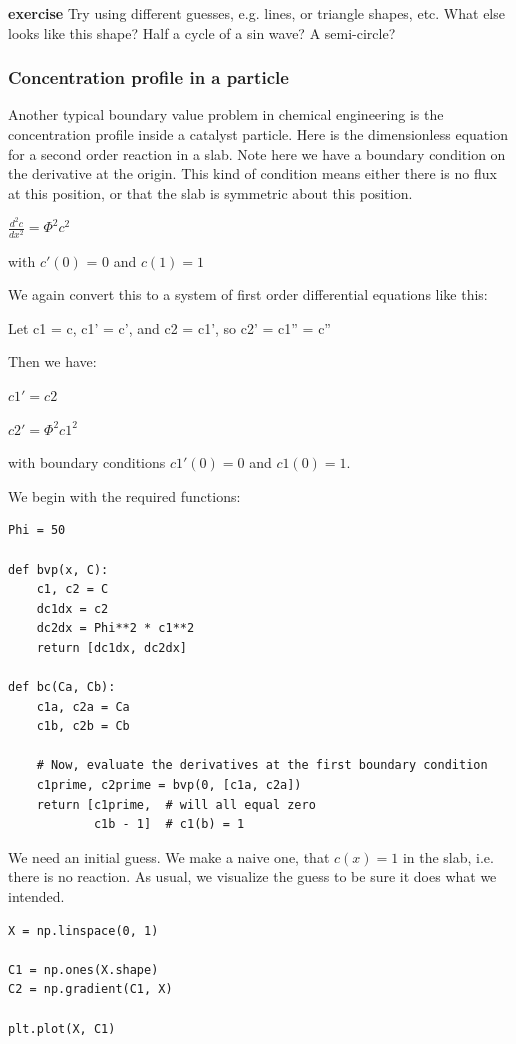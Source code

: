 \documentclass[11pt]{article}
\begin{document}
\textbf{exercise} Try using different guesses, e.g. lines, or triangle shapes, etc. What else looks like this shape? Half a cycle of a sin wave? A semi-circle?

\subsubsection{Concentration profile in a particle}
\label{sec:org2f36a69}

Another typical boundary value problem in chemical engineering is the concentration profile inside a catalyst particle. Here is the dimensionless equation for a second order reaction in a slab. Note here we have a boundary condition on the derivative at the origin. This kind of condition means either there is no flux at this position, or that the slab is symmetric about this position.

\(\frac{d^2c}{dx^2} = \Phi^2 c^2\)

with \(c'(0)\) = 0 and \(c(1) = 1\)

We again convert this to a system of first order differential equations like this:

Let c1 = c, c1' = c', and c2 = c1', so c2' = c1'' = c''

Then we have:

\(c1' = c2\)

\(c2' = \Phi^2 c1^2\)

with boundary conditions \(c1'(0) = 0\) and \(c1(0) = 1\).

We begin with the required functions:

\begin{verbatim}
Phi = 50

def bvp(x, C):
    c1, c2 = C
    dc1dx = c2
    dc2dx = Phi**2 * c1**2
    return [dc1dx, dc2dx]

def bc(Ca, Cb):
    c1a, c2a = Ca
    c1b, c2b = Cb

    # Now, evaluate the derivatives at the first boundary condition
    c1prime, c2prime = bvp(0, [c1a, c2a])
    return [c1prime,  # will all equal zero
            c1b - 1]  # c1(b) = 1
\end{verbatim}

We need an initial guess. We make a naive one, that \(c(x) = 1\) in the slab, i.e. there is no reaction. As usual, we visualize the guess to be sure it does what we intended.

\begin{verbatim}
X = np.linspace(0, 1)

C1 = np.ones(X.shape)
C2 = np.gradient(C1, X)

plt.plot(X, C1)
\end{verbatim}
\end{document}
